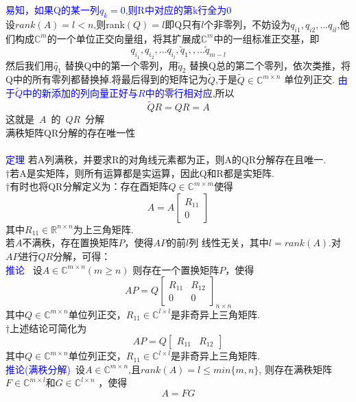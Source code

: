 \documentclass[12pt,a4paper]{article}
\begin{document}
\textcolor{blue}{易知，如果Q的某一列$q_k=0$,则R中对应的第k行全为0}\\
设$rank(A)=l<n$,则rank$(Q)=l$即Q只有$l$个非零列，不妨设为$ q_{i1},q_{i2},...q_{il} $,他们构成$ \mathbb{C}^m $的一个单位正交向量组，将其扩展成$ \mathbb{C}^m $中的一组标准正交基，即
\[
q_{i_1},q_{i_2},...q_{i_l},\tilde{q}_1,,...\tilde{q}_{m-l}
\]
然后我们用$ \tilde{q_1} $ 替换Q中的第一个零列，用$ \tilde{q}_2 $	替换Q总的第二个零列，依次类推，将Q中的所有零列都替换掉.将最后得到的矩阵记为$\tilde{Q}$,于是$\tilde{Q}\in\mathbb{C}^{m\times n}$ 单位列正交. \textcolor{blue}{由于$\tilde{Q}$中的新添加的列向量正好与$R$中的零行相对应},所以
\[
\tilde{Q}R=QR=A
\]
这就是~$A$~的~$QR$~分解\\


\noindent 满秩矩阵QR分解的存在唯一性\\
\\
\textcolor{blue}{定理} 若A列满秩，并要求R的对角线元素都为正，则A的QR分解存在且唯一.\\

$\dagger$若A是实矩阵，则所有运算都是实运算，因此Q和R都是实矩阵.\\

$\dagger$有时也将QR分解定义为：存在酉矩阵$Q\in\mathbb{C}^{m\times m}$使得
\[
A = A\begin{bmatrix}R_{11}\\0\end{bmatrix}
\]
其中$R_{11}\in\mathbb{R}^{n\times n}$为上三角矩阵.\\

若$A$不满秩，存在置换矩阵$P$，使得$AP$的前$l$列
线性无关，其中$l=rank(A)$.对$AP$进行$QR$分解，可得：\\
\textcolor{blue}{推论} ~设$A\in\mathbb{C}^{m\times n}(m\geq n)$ 则存在一个置换矩阵$P$，使得
\[
AP=Q\begin{bmatrix}R_{11}&R_{12}\\0&0\end{bmatrix}_{n\times n}
\]
其中$Q\in\mathbb{C}^{m\times n}$单位列正交，$R_{11}\in\mathbb{C}^{l\times l}$是非奇异上三角矩阵.\\
$\dagger$上述结论可简化为
\[
AP=Q\begin{bmatrix}R_{11}&R_{12}\end{bmatrix}
\]
其中$Q\in\mathbb{C}^{m\times n}$单位列正交，$R_{11}\in\mathbb{C}^{l\times l}$是非奇异上三角矩阵.\\
\textcolor{blue}{推论(满秩分解)}~设$A\in\mathbb{C}^{m\times n}$,且$rank(A)=l\le min\{m,n\}$, 则存在满秩矩阵$F\in\mathbb{C}^{m\times l}$和$G\in\mathbb{C}^{l\times n}$ ，使得
\[
A=FG
\]
\end{document}
